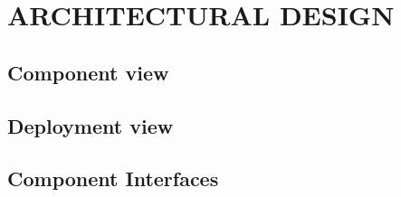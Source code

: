 \section{ARCHITECTURAL DESIGN}

	

	

	\subsection{Component view}

	\subsection{Deployment view}

	
	
	\subsection{Component Interfaces}
	
	
